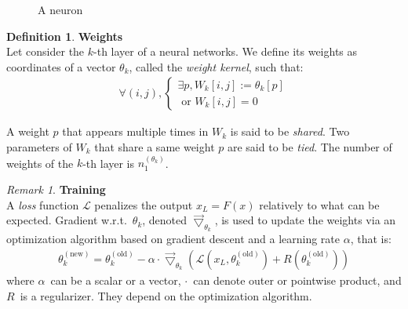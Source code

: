 \documentclass{article}
\theoremstyle{definition}
\newtheorem{definition}{Definition}[section]
\theoremstyle{remark}
\newtheorem{remark}{Remark}
\theoremstyle{plain}
\newcommand{\ovec}{}
\begin{document}
\begin{figure}[h]
\centering
{}
\caption{A neuron}
\label{fig:neuron}
\end{figure}

\begin{definition}\textbf{Weights}\\
Let consider the $k$-th layer of a neural networks. We define its weights as coordinates of a vector $\theta_k$, called the \emph{weight kernel}, such that:
\begin{gather*}
  \forall (i,j),
    \begin{cases}
      \exists p, W_k[i,j] := \theta_k[p] \\
      \text{ or } W_k[i,j] = 0
    \end{cases}
\end{gather*}
\end{definition}
A weight $p$ that appears multiple times in $W_k$ is said to be \emph{shared}. Two parameters of $W_k$ that share a same weight $p$ are said to be \emph{tied}. The number of weights of the $k$-th layer is $n_1^{(\theta_k)}$.


\begin{remark}\textbf{Training}\\
A \emph{loss} function $\mathcal{L}$ penalizes the output $x_L = F(\ovec{x})$ relatively to what can be expected. Gradient w.r.t.~$\theta_k$, denoted $\vec{\bigtriangledown}_{\theta_k}$, is used to update the weights via an optimization algorithm based on gradient descent and a learning rate $\alpha$, that is:
\begin{gather}
\theta_k^{(\text{new})} = \theta_k^{(\text{old})} - \alpha \cdot \vec{\bigtriangledown}_{\theta_k} \left( \mathcal{L}\left( x_L, \theta_k^{(\text{old})} \right) + R\left( \theta_k^{(\text{old})} \right) \right)
\end{gather}
where $\alpha$~can be a scalar or a vector, $\cdot$~can denote outer or pointwise product, and $R$~is a regularizer. They depend on the optimization algorithm.
\end{remark}
\end{document}
